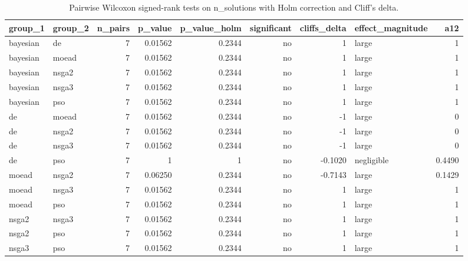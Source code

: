 \begin{table}[!t]
\centering
\caption{Pairwise Wilcoxon signed-rank tests on n_solutions with Holm correction and Cliff's delta.}
\label{tab:statistics_optimizer_pairwise_n_solutions_main}
\footnotesize
\begin{tabular}{llrrrrrlr}
\toprule
group\_1 & group\_2 & n\_pairs & p\_value & p\_value\_holm & significant & cliffs\_delta & effect\_magnitude & a12 \\
\midrule
bayesian & de & 7 & 0.01562 & 0.2344 & no & 1 & large & 1 \\
bayesian & moead & 7 & 0.01562 & 0.2344 & no & 1 & large & 1 \\
bayesian & nsga2 & 7 & 0.01562 & 0.2344 & no & 1 & large & 1 \\
bayesian & nsga3 & 7 & 0.01562 & 0.2344 & no & 1 & large & 1 \\
bayesian & pso & 7 & 0.01562 & 0.2344 & no & 1 & large & 1 \\
de & moead & 7 & 0.01562 & 0.2344 & no & -1 & large & 0 \\
de & nsga2 & 7 & 0.01562 & 0.2344 & no & -1 & large & 0 \\
de & nsga3 & 7 & 0.01562 & 0.2344 & no & -1 & large & 0 \\
de & pso & 7 & 1 & 1 & no & -0.1020 & negligible & 0.4490 \\
moead & nsga2 & 7 & 0.06250 & 0.2344 & no & -0.7143 & large & 0.1429 \\
moead & nsga3 & 7 & 0.01562 & 0.2344 & no & 1 & large & 1 \\
moead & pso & 7 & 0.01562 & 0.2344 & no & 1 & large & 1 \\
nsga2 & nsga3 & 7 & 0.01562 & 0.2344 & no & 1 & large & 1 \\
nsga2 & pso & 7 & 0.01562 & 0.2344 & no & 1 & large & 1 \\
nsga3 & pso & 7 & 0.01562 & 0.2344 & no & 1 & large & 1 \\
\bottomrule
\end{tabular}
\end{table}

